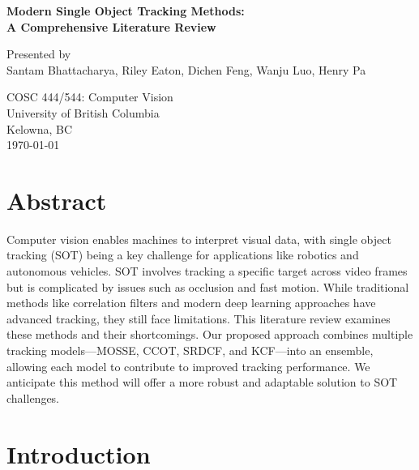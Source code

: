 \documentclass[11pt, letterpaper]{article}
\begin{document}
\begin{titlepage}
  \begin{center}
      \vspace*{1cm}
      
      \fontsize{18}{18}\textbf{Modern Single Object Tracking Methods:} \\
      \fontsize{18}{18}\textbf{A Comprehensive Literature Review}
      
      \vspace{0.5cm}
      Presented by \\
      Santam Bhattacharya, Riley Eaton, Dichen Feng, Wanju Luo, Henry Pa
      
      \vfill
          
      COSC 444/544: Computer Vision \\
      University of British Columbia \\
      Kelowna, BC \\
      \today
          
  \end{center}
\end{titlepage}

\clearpage
\section{Abstract}

Computer vision enables machines to interpret visual data, with single object tracking (SOT) being a key challenge for applications like robotics and autonomous vehicles. SOT involves tracking a specific target across video frames but is complicated by issues such as occlusion and fast motion. While traditional methods like correlation filters and modern deep learning approaches have advanced tracking, they still face limitations. This literature review examines these methods and their shortcomings. Our proposed approach combines multiple tracking models—MOSSE, CCOT, SRDCF, and KCF—into an ensemble, allowing each model to contribute to improved tracking performance. We anticipate this method will offer a more robust and adaptable solution to SOT challenges.



\section{Introduction}
\end{document}
